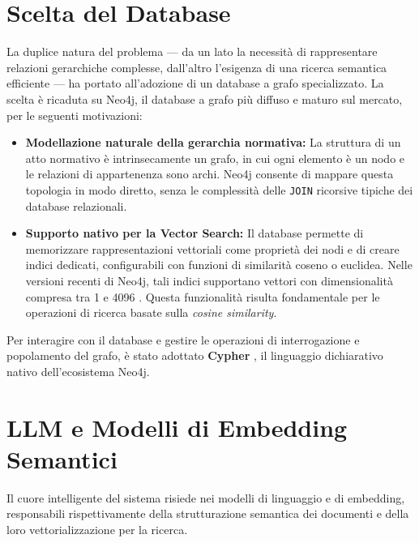 \section{Scelta del Database}
La duplice natura del problema — da un lato la necessità di rappresentare relazioni gerarchiche complesse, dall'altro l'esigenza di una ricerca semantica efficiente — ha portato all'adozione di un database a grafo specializzato.
La scelta è ricaduta su Neo4j, il database a grafo più diffuso e maturo sul mercato, per le seguenti motivazioni: 
    \begin{itemize}
        \item \textbf{Modellazione naturale della gerarchia normativa:} La struttura di un atto normativo è intrinsecamente un grafo, in cui ogni elemento è un nodo e le relazioni di appartenenza sono archi. Neo4j consente di mappare questa topologia in modo diretto, senza le complessità delle \texttt{JOIN} ricorsive tipiche dei database relazionali.
        \item \textbf{Supporto nativo per la Vector Search:} Il database permette di memorizzare rappresentazioni vettoriali come proprietà dei nodi e di creare indici dedicati, configurabili con funzioni di similarità coseno o euclidea. Nelle versioni recenti di Neo4j, tali indici supportano vettori con dimensionalità compresa tra 1 e 4096 \cite{neo4j_vector_indexes}. Questa funzionalità risulta fondamentale per le operazioni di ricerca basate sulla \textit{cosine similarity}.
    \end{itemize}

Per interagire con il database e gestire le operazioni di interrogazione e popolamento del grafo, è stato adottato \textbf{Cypher} \cite{cypher}, il linguaggio dichiarativo nativo dell'ecosistema Neo4j.

\section{LLM e Modelli di Embedding Semantici}\label{sec:llm_embedding_models}
Il cuore intelligente del sistema risiede nei modelli di linguaggio e di embedding, responsabili rispettivamente della strutturazione semantica dei documenti e della loro vettorializzazione per la ricerca.

